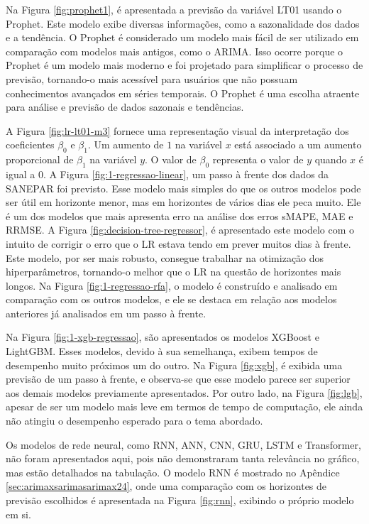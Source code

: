 Na Figura \ref{fig:prophet1}, é apresentada a previsão da variável LT01 usando o Prophet. Este modelo exibe diversas informações, como a sazonalidade dos dados e a tendência. O Prophet é considerado um modelo mais fácil de ser utilizado em comparação com modelos mais antigos, como o ARIMA. Isso ocorre porque o Prophet é um modelo mais moderno e foi projetado para simplificar o processo de previsão, tornando-o mais acessível para usuários que não possuam conhecimentos avançados em séries temporais. O Prophet é uma escolha atraente para análise e previsão de dados sazonais e tendências.

A Figura \ref{fig:lr-lt01-m3} fornece uma representação visual da interpretação dos coeficientes $\beta_0$ e $\beta_1$. Um aumento de $1$ na variável $x$ está associado a um aumento proporcional de $\beta_1$ na variável $y$. O valor de $\beta_0$ representa o valor de $y$ quando $x$ é igual a $0$.
A Figura \ref{fig:1-regressao-linear}, um passo à frente dos dados da SANEPAR foi previsto. Esse modelo mais simples do que os outros modelos pode ser útil em horizonte menor, mas em horizontes de vários dias ele peca muito. Ele é um dos modelos que mais apresenta erro na análise dos erros sMAPE, MAE e RRMSE.
A Figura \ref{fig:decision-tree-regressor}, é apresentado este modelo com o intuito de corrigir o erro que o LR estava tendo em prever muitos dias à frente. Este modelo, por ser mais robusto, consegue trabalhar na otimização dos hiperparâmetros, tornando-o melhor que o LR na questão de horizontes mais longos.
Na Figura \ref{fig:1-regressao-rfa}, o modelo é construído e analisado em comparação com os outros modelos, e ele se destaca em relação aos modelos anteriores já analisados em um passo à frente.

Na Figura \ref{fig:1-xgb-regressao}, são apresentados os modelos XGBoost e LightGBM. Esses modelos, devido à sua semelhança, exibem tempos de desempenho muito próximos um do outro. Na Figura \ref{fig:xgb}, é exibida uma previsão de um passo à frente, e observa-se que esse modelo parece ser superior aos demais modelos previamente apresentados. Por outro lado, na Figura \ref{fig:lgb}, apesar de ser um modelo mais leve em termos de tempo de computação, ele ainda não atingiu o desempenho esperado para o tema abordado.

Os modelos de rede neural, como RNN, ANN, CNN, GRU, LSTM e Transformer, não foram apresentados aqui, pois não demonstraram tanta relevância no gráfico, mas estão detalhados na tabulação. O modelo RNN é mostrado no Apêndice \ref{sec:arimaxsarimasarimax24}, onde uma comparação com os horizontes de previsão escolhidos é apresentada na Figura \ref{fig:rnn}, exibindo o próprio modelo em si.

